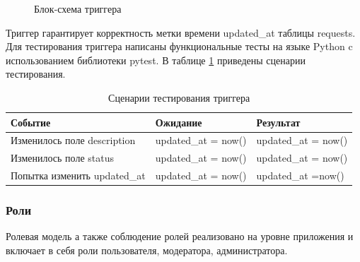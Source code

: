 \begin{figure}[h!]
	\caption{Блок-схема триггера}
	\label{fig:trigger}
\end{figure}

Триггер гарантирует корректность метки времени updated{\_}at таблицы requests. Для тестирования триггера написаны функциональные тесты на языке Python c использованием библиотеки pytest. В таблице \ref{tab:trigger_tests} приведены сценарии тестирования.

\begin{table}[ht!]
	\centering
	\caption{\label{tab:trigger_tests} Сценарии тестирования триггера}
	\begin{tabular}{|p{7.5cm}|p{4cm}|p{4cm}|}
		\hline
		\textbf{Событие} & \textbf{Ожидание} & \textbf{Результат}\\
		\hline
		Изменилось поле description & updated{\_}at = now() & updated{\_}at = now() \\
		\hline
		Изменилось поле status & updated{\_}at = now() & updated{\_}at =  now() \\
		\hline
		Попытка изменить updated{\_}at & updated{\_}at = now() & updated{\_}at =now() \\
		\hline
		
	\end{tabular}
\end{table}

\subsubsection{Роли}

Ролевая модель а также соблюдение ролей реализовано на уровне приложения и включает в себя
роли пользователя, модератора, администратора.

